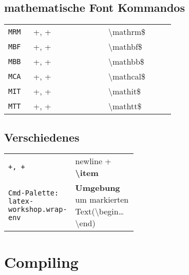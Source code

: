 \documentclass[8pt]{extarticle} %
\begin{document}
\begin{multicols}{3}
\vspace*{1ex}
  \subsection{mathematische Font Kommandos}
  \vspace*{1ex}
	\begin{tabular}{L{0.15\linewidth} L{0.45\linewidth} L{0.5\linewidth}}
	\tt MRM & \Ctrl +, \Ctrl + & \textbackslash mathrm\textbraceleft\$\textbraceright\textbraceright \\
	\tt MBF & \Ctrl +, \Ctrl + & \textbackslash mathbf\textbraceleft\$\textbraceright\textbraceright \\
	\tt MBB & \Ctrl +, \Ctrl + & \textbackslash mathbb\textbraceleft\$\textbraceright\textbraceright \\
	\tt MCA & \Ctrl +, \Ctrl + & \textbackslash mathcal\textbraceleft\$\textbraceright\textbraceright \\
	\tt MIT & \Ctrl +, \Ctrl + & \textbackslash mathit\textbraceleft\$\textbraceright\textbraceright \\
	\tt MTT & \Ctrl +, \Ctrl + & \textbackslash mathtt\textbraceleft\$\textbraceright\textbraceright \\
 \end{tabular}

\vspace*{1ex}
  \subsection{Verschiedenes}
  \vspace*{1ex}
	\begin{tabular}{L{.5\linewidth} L{0.5\linewidth}}
	\tt \Ctrl +, \Ctrl +\Return & newline + \textbf{\textbackslash item} \\
	\tt Cmd-Palette: latex-workshop.wrap-env & \textbf{Umgebung} um markierten Text(\textbackslash begin\textbraceleft \textbraceright \ldots \textbackslash end\textbraceleft \textbraceright)\\
 \end{tabular}

\vspace*{1ex}
\section{Compiling}
\vspace*{1ex}

\end{multicols}
\end{document}
